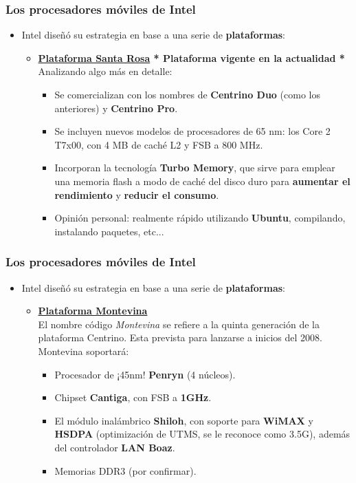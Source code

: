 \frame
{
\frametitle{Los procesadores móviles de Intel}
\begin{itemize}
 \item Intel diseñó su estrategia en base a una serie de \textbf{plataformas}:
	\begin{itemize}
	 \item \textbf{\underline{Plataforma Santa Rosa} * Plataforma vigente en la actualidad *}\\
	Analizando algo más en detalle:
		\begin{itemize}
		\item Se comercializan con los nombres de \textbf{Centrino Duo} (como los anteriores) y \textbf{Centrino Pro}.
		\item Se incluyen nuevos modelos de procesadores de 65 nm: los Core 2 T7x00, con 4 MB de caché L2 y FSB a 800 MHz.
		\item Incorporan la tecnología \textbf{Turbo Memory}, que sirve para emplear una memoria flash a modo de caché del disco duro para \textbf{aumentar el rendimiento} y \textbf{reducir el consumo}.
		\item Opinión personal: realmente rápido utilizando \textbf{Ubuntu}, compilando, instalando paquetes, etc...
		\end{itemize}
	\end{itemize}
\end{itemize}
}

\frame
{
\frametitle{Los procesadores móviles de Intel}
\begin{itemize}
 \item Intel diseñó su estrategia en base a una serie de \textbf{plataformas}:
	\begin{itemize}
	 \item \textbf{\underline{Plataforma Montevina}}\\
	El nombre código \textit{Montevina} se refiere a la quinta generación de la plataforma Centrino. Esta prevista para lanzarse a inicios del 2008. Montevina soportará:

		\begin{itemize}
		\item Procesador de ¡45nm! \textbf{Penryn} (4 núcleos).
		\item Chipset \textbf{Cantiga}, con FSB a \textbf{1GHz}.
		\item El módulo inalámbrico \textbf{Shiloh}, con soporte para \textbf{WiMAX} y \textbf{HSDPA} (optimización de UTMS, se le reconoce como 3.5G), además del controlador \textbf{LAN Boaz}.
		\item Memorias DDR3 (por confirmar).
		\end{itemize}
	\end{itemize}
\end{itemize}
}

